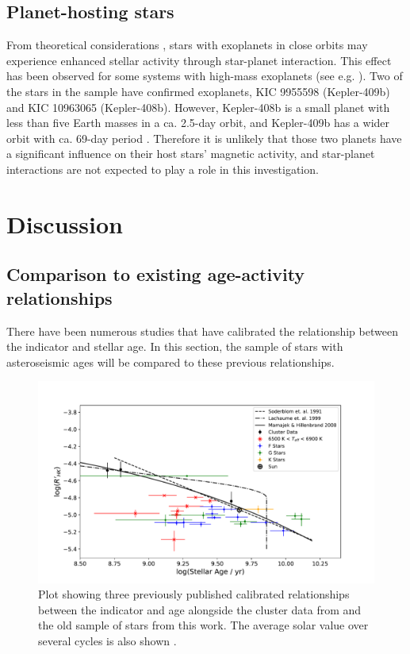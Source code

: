 \subsection{Planet-hosting stars}
From theoretical considerations \citep{Cuntz_etal_2000}, stars with exoplanets in close orbits may experience enhanced stellar activity through star-planet interaction. This effect has been observed for some systems with high-mass exoplanets (see e.g. \citealt{Poppenhaeger_Wolk_2014,Pillitteri_etal_2015}). Two of the stars in the sample have confirmed exoplanets, KIC 9955598 (Kepler-409b) and KIC 10963065 (Kepler-408b). However, Kepler-408b is a small planet with less than five Earth masses in a ca. 2.5-day orbit, and Kepler-409b has a wider orbit with ca. 69-day period \citep{Marcy_etal_2014}. Therefore it is unlikely that those two planets have a significant influence on their host stars' magnetic activity, and star-planet interactions are not expected to play a role in this investigation.

\section{Discussion}
\label{Chp4_discussion}

\subsection{Comparison to existing age-activity relationships}
\label{Chp4_discus_previous_relations}
There have been numerous studies that have calibrated the relationship between the \Rprime indicator and stellar age. In this section, the sample of stars with asteroseismic ages will be compared to these previous relationships.

\begin{figure}
    \centering
    \includegraphics[scale=0.55]{Figures/4-Chromospheric_age/ca_results_3_relationship.pdf}
    \caption[Comparison of sample to previous age-activity relationships]{Plot showing three previously published calibrated relationships between the \Rprime indicator and age \citep{Soderblom_etal_1991,Lachaume_etal_1999,Mamajek_Hillenbrand_2008} alongside the cluster data from \citet{Mamajek_Hillenbrand_2008} and the old sample of stars from this work. The average solar value over several cycles is also shown \citep{Egeland_etal_2017}.}
    \label{fig:comparison_previous_relationships_ca}
\end{figure}

